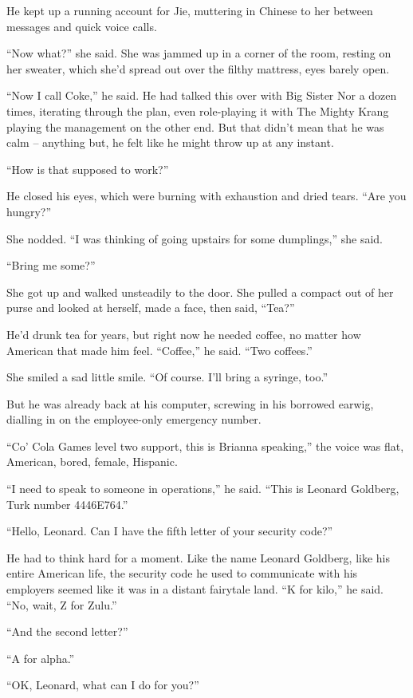 He kept up a running account for Jie, muttering in Chinese to her
between messages and quick voice calls.

``Now what?'' she said. She was jammed up in a corner of the room,
resting on her sweater, which she'd spread out over the filthy
mattress, eyes barely open.

``Now I call Coke,'' he said. He had talked this over with Big Sister
Nor a dozen times, iterating through the plan, even role-playing it
with The Mighty Krang playing the management on the other end. But
that didn't mean that he was calm -- anything but, he felt like he
might throw up at any instant.

``How is that supposed to work?''

He closed his eyes, which were burning with exhaustion and dried
tears. ``Are you hungry?''

She nodded. ``I was thinking of going upstairs for some dumplings,''
she said.

``Bring me some?''

She got up and walked unsteadily to the door. She pulled a compact
out of her purse and looked at herself, made a face, then said,
``Tea?''

He'd drunk tea for years, but right now he needed coffee, no matter
how American that made him feel. ``Coffee,'' he said. ``Two coffees.''

She smiled a sad little smile. ``Of course. I'll bring a syringe,
too.''

But he was already back at his computer, screwing in his borrowed
earwig, dialling in on the employee-only emergency number.

``Co' Cola Games level two support, this is Brianna speaking,'' the
voice was flat, American, bored, female, Hispanic.

``I need to speak to someone in operations,'' he said. ``This is
Leonard Goldberg, Turk number 4446E764.''

``Hello, Leonard. Can I have the fifth letter of your security
code?''

He had to think hard for a moment. Like the name Leonard Goldberg,
like his entire American life, the security code he used to
communicate with his employers seemed like it was in a distant
fairytale land. ``K for kilo,'' he said. ``No, wait, Z for Zulu.''

``And the second letter?''

``A for alpha.''

``OK, Leonard, what can I do for you?''

